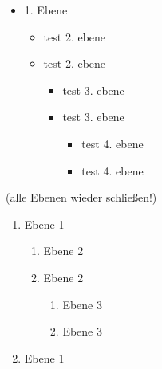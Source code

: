 \documentclass{like}
\begin{document}
\begin{minipage}[t!]{0.38\textwidth}
\vspace*{.5cm}
\begin{itemize}
\item 1. Ebene
\begin{itemize}
\item  test 2. ebene
\item  test 2. ebene
\begin{itemize}
\item  test 3. ebene
\item  test 3. ebene
\begin{itemize}
\item  test 4. ebene
\item  test 4. ebene
\end{itemize}    
\end{itemize}
\end{itemize}
\end{itemize}(alle Ebenen wieder schließen!)
\par\bigskip
\begin{enumerate}
	\item Ebene 1
		\begin{enumerate}
			\item Ebene 2
			\item Ebene 2
				\begin{enumerate}
					\item Ebene 3
					\item Ebene 3
				\end{enumerate}
		\end{enumerate}
		\item Ebene 1
	\end{enumerate}
\end{minipage}
\par
\end{document}
